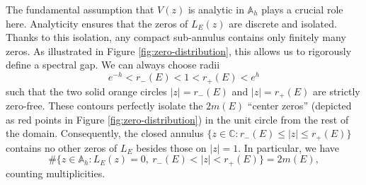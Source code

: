 \documentclass[reqno,11pt]{amsart}
\begin{document}
The fundamental assumption that $V(z)$ is analytic in $\mathbb A_h$ plays a crucial role here. Analyticity ensures that the zeros of $L_{E}^{}(z)$ are discrete and isolated. Thanks to this isolation, any compact sub-annulus contains only finitely many zeros. As illustrated in Figure \ref{fig:zero-distribution}, this allows us to rigorously define a spectral gap. We can always choose radii
$$
e^{-h} < r_-(E) < 1 < r_+(E) < e^h
$$
such that the two solid orange circles $|z|=r_-(E)$ and $|z|=r_+(E)$ are strictly zero-free. These contours perfectly isolate the $2m(E)$ ``center zeros'' (depicted as red points in Figure \ref{fig:zero-distribution}) in the unit circle from the rest of the domain. Consequently, the closed annulus $\{z\in\mathbb C: r_-(E) \le |z| \le r_+(E)\}$ contains no other zeros of $L_{E}^{}$ besides those on $|z|=1$. In particular, we have
$$
\#\{z\in\mathbb{A}_h: L_{E}^{}(z)=0,\ r_-(E) < |z| < r_+(E)\} = 2m(E),
$$
counting multiplicities. 
\end{document}
